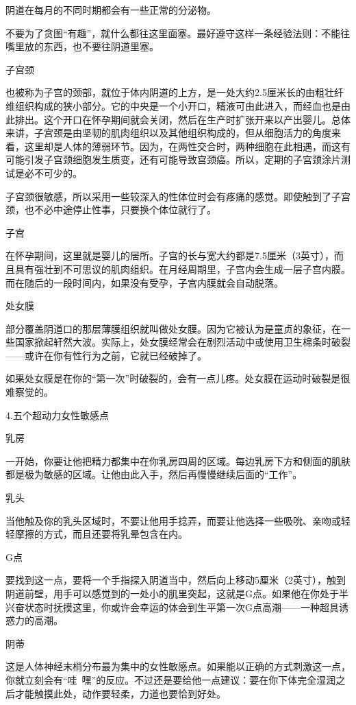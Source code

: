 \documentclass[12pt,UTF8,openany]{ctexbook}
\begin{document}
阴道在每月的不同时期都会有一些正常的分泌物。

不要为了贪图“有趣”，就什么都往这里面塞。最好遵守这样一条经验法则：不能往嘴里放的东西，也不要往阴道里塞。

子宫颈

也被称为子宫的颈部，就位于体内阴道的上方，是一处大约2.5厘米长的由粗壮纤维组织构成的狭小部分。它的中央是一个小开口，精液可由此进入，而经血也是由此排出。这个开口在怀孕期间就会关闭，然后在生产时扩张开来以产出婴儿。总体来讲，子宫颈是由坚韧的肌肉组织以及其他组织构成的，但从细胞活力的角度来看，这里却是人体的薄弱环节。因为，在两性交合时，两种细胞在此相遇，而这有可能引发子宫颈细胞发生质变，还有可能导致宫颈癌。所以，定期的子宫颈涂片测试是必不可少的。

子宫颈很敏感，所以采用一些较深入的性体位时会有疼痛的感觉。即使触到了子宫颈，也不必中途停止性事，只要换个体位就行了。

子宫

在怀孕期间，这里就是婴儿的居所。子宫的长与宽大约都是7.5厘米（3英寸），而且具有强壮到不可思议的肌肉组织。在月经周期里，子宫内会生成一层子宫内膜。而在随后的一段时间内，如果没有受孕，子宫内膜就会自动脱落。

处女膜

部分覆盖阴道口的那层薄膜组织就叫做处女膜。因为它被认为是童贞的象征，在一些国家掀起轩然大波。实际上，处女膜经常会在剧烈活动中或使用卫生棉条时破裂——或许在你有性行为之前，它就已经破掉了。

如果处女膜是在你的“第一次”时破裂的，会有一点儿疼。处女膜在运动时破裂是很难察觉的。

4.五个超动力女性敏感点

乳房

一开始，你要让他把精力都集中在你乳房四周的区域。每边乳房下方和侧面的肌肤都是极为敏感的区域。让他由此入手，然后再慢慢继续后面的“工作”。

乳头

当他触及你的乳头区域时，不要让他用手捻弄，而要让他选择一些吸吮、亲吻或轻轻摩擦的方式，而且还要将乳晕包含在内。

G点

要找到这一点，要将一个手指探入阴道当中，然后向上移动5厘米（2英寸），触到阴道前壁，用手可以感觉到的一处小的肌里突起，这就是G点。如果他在你处于半兴奋状态时抚摸这里，你或许会幸运的体会到生平第一次G点高潮——一种超具诱惑力的高潮。

阴蒂

这是人体神经末梢分布最为集中的女性敏感点。如果能以正确的方式刺激这一点，你就立刻会有“哇~嘿”的反应。不过还是要给他一点建议：要在你下体完全湿润之后才能触摸此处，动作要轻柔，力道也要恰到好处。
\end{document}
